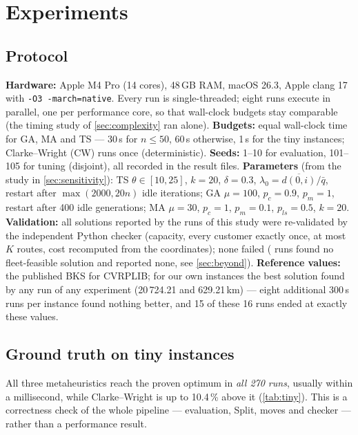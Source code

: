 \section{Experiments}\label{sec:experiments}
\subsection{Protocol}\label{sec:setup}
\textbf{Hardware:} Apple M4 Pro (14 cores), 48\,GB RAM, macOS 26.3, Apple clang 17 with
\texttt{-O3 -march=native}. Every run is single-threaded; eight runs execute in parallel, one per performance
core, so that wall-clock budgets stay comparable (the timing study of \cref{sec:complexity} ran alone).
\textbf{Budgets:} equal wall-clock time for GA, MA and TS --- 30\,s for $n\le50$, 60\,s otherwise, 1\,s for
the tiny instances; Clarke--Wright (CW) runs once (deterministic).
\textbf{Seeds:} 1--10 for evaluation, 101--105 for tuning (disjoint), all recorded in the result files.
\textbf{Parameters} (from the study in \cref{sec:sensitivity}): TS $\theta\in[10,25]$, $k=20$, $\delta=0.3$,
$\lambda_0=\overline{d(0,i)}/\bar q$, restart after $\max(2000,20n)$ idle iterations; GA $\mu=100$, $p_c=0.9$,
$p_m=1$, restart after 400 idle generations; MA $\mu=30$, $p_c=1$, $p_m=0.1$, $p_{ls}=0.5$, $k=20$.
\textbf{Validation:} all \nReported{} solutions reported by the \nRuns{} runs of this study were re-validated by the
independent Python checker (capacity, every customer exactly once, at most $K$ routes, cost recomputed from the
coordinates); none failed (\nNone{} runs found no fleet-feasible solution and reported none, see \cref{sec:beyond}). \textbf{Reference values:} the published BKS for CVRPLIB; for our own
instances the best solution found by any run of any experiment (20\,724.21 and 629.21\,km) --- eight additional
300\,s runs per instance found nothing better, and 15 of these 16 runs ended at exactly these values.

\subsection{Ground truth on tiny instances}
\begin{table}[h]
\centering\small
\caption{Tiny instances ($Q=50$): exact optimum (identical by Held--Karp/set-partitioning DP and by MILP;
for $n\le8$ also by enumeration) and how many of 10 runs (1\,s each) reached it. $^\dagger$: CW exceeds $K$.}
\label{tab:tiny}

\end{table}
All three metaheuristics reach the proven optimum in \emph{all 270 runs}, usually within a millisecond, while
Clarke--Wright is up to 10.4\,\% above it (\cref{tab:tiny}). This is a correctness check of the whole
pipeline --- evaluation, Split, moves and checker --- rather than a performance result.


